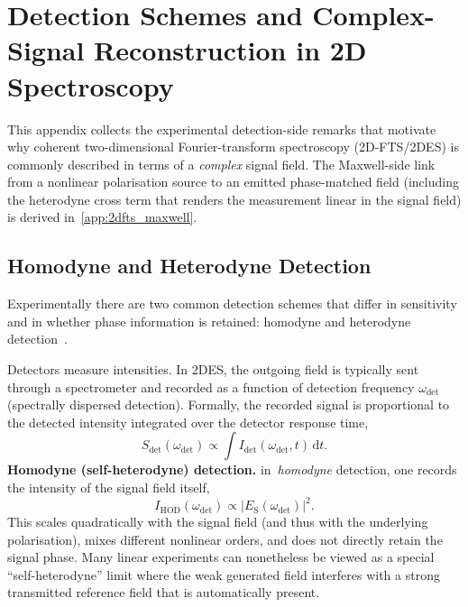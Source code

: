 \chapter{Detection Schemes and Complex-Signal Reconstruction in 2D Spectroscopy}
\label{app:detection_schemes}

This appendix collects the experimental detection-side remarks that motivate why coherent two-dimensional Fourier-transform spectroscopy (2D-FTS/2DES) is commonly described in terms of a \emph{complex} signal field. The Maxwell-side link from a nonlinear polarisation source to an emitted phase-matched field (including the heterodyne cross term that renders the measurement linear in the signal field) is derived in~\autoref{app:2dfts_maxwell}.

\section{Homodyne and Heterodyne Detection}
\label{app:sec:homodyne_heterodyne}

Experimentally there are two common detection schemes that differ in sensitivity and in whether phase information is retained: homodyne and heterodyne detection~\cite{abramaviciusetal2009coherentmultidimensionaloptical}.


Detectors measure intensities. In 2DES, the outgoing field is typically sent through a spectrometer and recorded as a function of detection frequency $\omega_{\mathrm{det}}$ (spectrally dispersed detection). Formally, the recorded signal is proportional to the detected intensity integrated over the detector response time,
\begin{equation}
	S_{\mathrm{det}}(\omega_{\mathrm{det}}) \propto \int I_{\mathrm{det}}(\omega_{\mathrm{det}},t)\,\mathrm{d}t.
	\label{eq:spctr_signal_intensity}
\end{equation}
\textbf{Homodyne (self-heterodyne) detection.}
in~\emph{homodyne} detection, one records the intensity of the signal field itself,
\begin{equation}
	I_{\mathrm{HOD}}(\omega_{\mathrm{det}}) \propto \big|E_{\mathrm{S}}(\omega_{\mathrm{det}})\big|^2.
\end{equation}
This scales quadratically with the signal field (and thus with the underlying polarisation), mixes different nonlinear orders, and does not directly retain the signal phase. Many linear experiments can nonetheless be viewed as a special ``self-heterodyne'' limit where the weak generated field interferes with a strong transmitted reference field that is automatically present.

